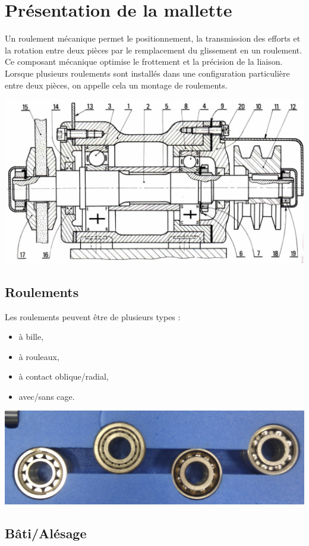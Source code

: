 

\section{Présentation de la mallette}

Un roulement mécanique permet le positionnement, la transmission des efforts et la rotation entre deux pièces par le remplacement du glissement en un roulement. Ce composant mécanique optimise le frottement et la précision de la liaison. Lorsque plusieurs roulements sont installés dans une configuration particulière entre deux pièces, on appelle cela un montage de roulements.

\begin{center}
\includegraphics[width=0.5\linewidth]{img/Roulement1.jpg}
\end{center}

\subsection{Roulements}

Les roulements peuvent être de plusieurs types :
\begin{itemize}
 \item à bille,
 \item à rouleaux,
 \item à contact oblique/radial,
 \item avec/sans cage.
\end{itemize}

\begin{center}
\includegraphics[width=0.5\linewidth]{img/Roulement2.jpg}
\end{center}


\subsection{Bâti/Alésage}

